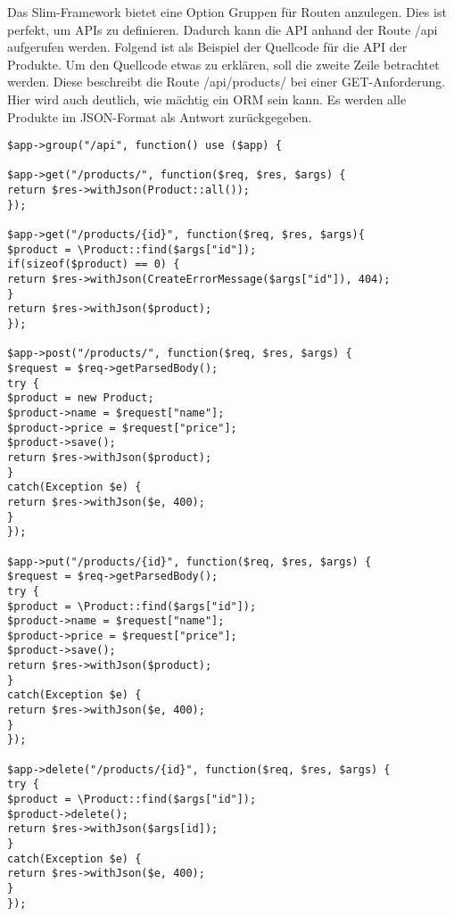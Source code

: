 Das Slim-Framework bietet eine Option Gruppen für Routen anzulegen. Dies ist perfekt, um APIs zu definieren. Dadurch kann die API anhand der Route /api aufgerufen werden. Folgend ist als Beispiel der Quellcode für die API der Produkte. Um den Quellcode etwas zu erklären, soll die zweite Zeile betrachtet werden. Diese beschreibt die Route /api/products/ bei einer GET-Anforderung. Hier wird auch deutlich, wie mächtig ein \ac{ORM} sein kann. Es werden alle Produkte im JSON-Format als Antwort zurückgegeben.
\lstset{language=PHP} 
\begin{lstlisting}[frame=single]
$app->group("/api", function() use ($app) {  

$app->get("/products/", function($req, $res, $args) {
return $res->withJson(Product::all());
});

$app->get("/products/{id}", function($req, $res, $args){
$product = \Product::find($args["id"]);
if(sizeof($product) == 0) {
return $res->withJson(CreateErrorMessage($args["id"]), 404);
}
return $res->withJson($product);
});

$app->post("/products/", function($req, $res, $args) {
$request = $req->getParsedBody();
try {
$product = new Product;
$product->name = $request["name"];
$product->price = $request["price"];
$product->save();
return $res->withJson($product);
}
catch(Exception $e) {
return $res->withJson($e, 400);
}
});

$app->put("/products/{id}", function($req, $res, $args) {
$request = $req->getParsedBody();
try {
$product = \Product::find($args["id"]);
$product->name = $request["name"];
$product->price = $request["price"];
$product->save();
return $res->withJson($product);
}
catch(Exception $e) {
return $res->withJson($e, 400);
}
});

$app->delete("/products/{id}", function($req, $res, $args) {
try {
$product = \Product::find($args["id"]);
$product->delete();
return $res->withJson($args[id]);
}
catch(Exception $e) {
return $res->withJson($e, 400);
}
});
\end{lstlisting}